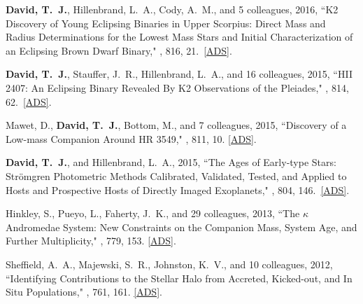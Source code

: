\item {\bf {\bf David, T.}~J.}, {Hillenbrand}, L.~A., {Cody}, A.~M., and 5 colleagues, 2016, ``{K2 Discovery of Young Eclipsing Binaries in Upper Scorpius: Direct Mass and Radius Determinations for the Lowest Mass Stars and Initial Characterization of an Eclipsing Brown Dwarf Binary}," \apj, 816, 21.\ \href{https://ui.adsabs.harvard.edu/#abs/2016ApJ...816...21D/}{[ADS]}.

\item {\bf {\bf David, T.}~J.}, {Stauffer}, J.~R., {Hillenbrand}, L.~A., and 16 colleagues, 2015, ``{HII 2407: An Eclipsing Binary Revealed By K2 Observations of the Pleiades}," \apj, 814, 62.\ \href{https://ui.adsabs.harvard.edu/#abs/2015ApJ...814...62D/}{[ADS]}.

\item {Mawet}, D., {\bf {David}, T.~J.}, {Bottom}, M., and 7 colleagues, 2015, ``{Discovery of a Low-mass Companion Around HR 3549}," \apj, 811, 10. \href{https://ui.adsabs.harvard.edu/#abs/2015ApJ...811..103M}{[ADS]}.

\item {\bf {\bf David, T.}~J.}, and {Hillenbrand}, L.~A., 2015, ``{The Ages of Early-type Stars: Str{\"o}mgren Photometric Methods Calibrated, Validated, Tested, and Applied to Hosts and Prospective Hosts of Directly Imaged Exoplanets}," \apj, 804, 146.\ \href{https://ui.adsabs.harvard.edu/#abs/2015ApJ...804..146D/}{[ADS]}.

\item {Hinkley}, S., {Pueyo}, L., {Faherty}, J.~K., and 29 colleagues, 2013, ``{The {\ensuremath{\kappa}} Andromedae System: New Constraints on the Companion Mass, System Age, and Further Multiplicity}," \apj, 779, 153. \href{https://ui.adsabs.harvard.edu/#abs/2013ApJ...779..153H}{[ADS]}.

\item {Sheffield}, A.~A., {Majewski}, S.~R., {Johnston}, K.~V., and 10 colleagues, 2012, ``{Identifying Contributions to the Stellar Halo from Accreted, Kicked-out, and In Situ Populations}," \apj, 761, 161. \href{https://ui.adsabs.harvard.edu/#abs/2012ApJ...761..161S}{[ADS]}. 